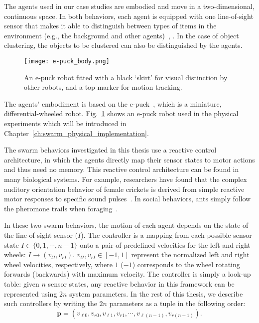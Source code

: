 The agents used in our case studies are embodied and move in a two-dimensional, continuous space. In both behaviors, each agent is equipped with one line-of-sight sensor that makes it able to distinguish between types of items in the environment (e.g., the background and other agents)~\cite{Gauci2014_ijrr}, \cite{Melvin2014_aamas}. In the case of object clustering, the objects to be clustered can also be distinguished by the agents. 
%
\begin{figure}[!t]
	\centering
	\texttt{[image: e-puck\_body.png]}
	\caption{An e-puck robot fitted with a black `skirt' for visual distinction by other robots, and a top marker for motion tracking.}
	\label{fig:e-puck_body}
\end{figure}
%
The agents' embodiment is based on the e-puck~\cite{e-puck}, which is a miniature, differential-wheeled robot. Fig.~\ref{fig:e-puck_body} shows an e-puck robot used in the physical experiments which will be introduced in Chapter~\ref{ch:swarm_physical_implementation}.

The swarm behaviors investigated in this thesis use a reactive control architecture, in which the agents directly map their sensor states to motor actions and thus need no memory. This reactive control architecture can be found in many biological systems. For example, researchers have found that the complex auditory orientation behavior of female crickets is derived from simple reactive motor responses to specific sound pulses~\cite{Hedwig2004}. In social behaviors, ants simply follow the pheromone trails when foraging~\cite{Carroll1973}. 

In these two swarm behaviors, the motion of each agent depends on the state of the line-of-sight sensor ($I$). The controller is a mapping from each possible sensor state $I\in\{0,1,\cdots,n-1\}$ onto a pair of predefined velocities for the left and right wheels: $I  \rightarrow (v_{lI}, v_{rI})$. $v_{lI}, v_{rI} \in \left[-1,1\right]$ represent the normalized left and right wheel velocities, respectively, where $1$ ($-1$) corresponds to the wheel rotating forwards (backwards) with maximum velocity. The controller is simply a look-up table: given $n$ sensor states, any reactive behavior in this framework can be represented using $2n$ system parameters. In the rest of this thesis, we describe such controllers by writing the $2n$ parameters as a tuple in the following order:
\begin{equation}\label{controller:form}
\mathbf{p} = (v_{\ell 0}, v_{r0}, v_{\ell1}, v_{r1}, \cdots, v_{\ell (n-1)}, v_{r (n-1)}).
\end{equation}


